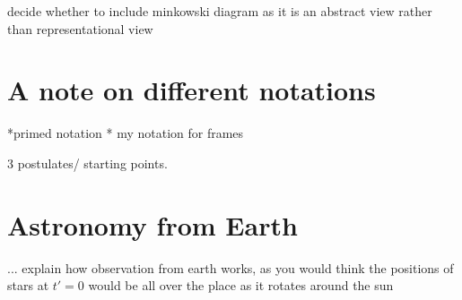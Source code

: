 decide whether to include minkowski diagram as it is an abstract view rather than representational view

\section{A note on different notations}
*primed notation
* my notation for frames

3 postulates/ starting points.

\section{Astronomy from Earth}

... explain how observation from earth works, as you would think the positions of stars at $t'=0$ would be all over the place as it rotates around the sun
